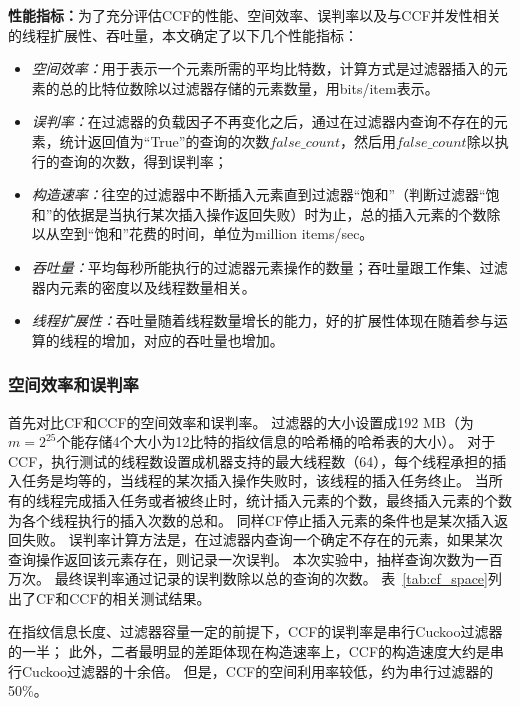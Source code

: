 \textbf{性能指标：}为了充分评估CCF的性能、空间效率、误判率以及与CCF并发性相关的线程扩展性、吞吐量，本文确定了以下几个性能指标：
\begin{itemize}
 \item \textit{空间效率：}用于表示一个元素所需的平均比特数，计算方式是过滤器插入的元素的总的比特位数除以过滤器存储的元素数量，用bits/item表示。
 \item \textit{误判率：}在过滤器的负载因子不再变化之后，通过在过滤器内查询不存在的元素，统计返回值为“True”的查询的次数$false\_count$，然后用$false\_count$除以执行的查询的次数，得到误判率；
 \item \textit{构造速率：}往空的过滤器中不断插入元素直到过滤器“饱和”（判断过滤器“饱和”的依据是当执行某次插入操作返回失败）时为止，总的插入元素的个数除以从空到“饱和”花费的时间，单位为million items/sec。
 \item \textit{吞吐量：}平均每秒所能执行的过滤器元素操作的数量；吞吐量跟工作集、过滤器内元素的密度以及线程数量相关。
 \item \textit{线程扩展性：}吞吐量随着线程数量增长的能力，好的扩展性体现在随着参与运算的线程的增加，对应的吞吐量也增加。
\end{itemize}    

\subsubsection{空间效率和误判率}

首先对比CF和CCF的空间效率和误判率。
过滤器的大小设置成192 MB（为$m = 2^{25}$个能存储4个大小为12比特的指纹信息的哈希桶的哈希表的大小）。
对于CCF，执行测试的线程数设置成机器支持的最大线程数（64），每个线程承担的插入任务是均等的，当线程的某次插入操作失败时，该线程的插入任务终止。
当所有的线程完成插入任务或者被终止时，统计插入元素的个数，最终插入元素的个数为各个线程执行的插入次数的总和。
同样CF停止插入元素的条件也是某次插入返回失败。
误判率计算方法是，在过滤器内查询一个确定不存在的元素，如果某次查询操作返回该元素存在，则记录一次误判。
本次实验中，抽样查询次数为一百万次。
最终误判率通过记录的误判数除以总的查询的次数。
表~\ref{tab:cf_space}列出了CF和CCF的相关测试结果。

在指纹信息长度、过滤器容量一定的前提下，CCF的误判率是串行Cuckoo过滤器的一半；
此外，二者最明显的差距体现在构造速率上，CCF的构造速度大约是串行Cuckoo过滤器的十余倍。
但是，CCF的空间利用率较低，约为串行过滤器的50\%。

